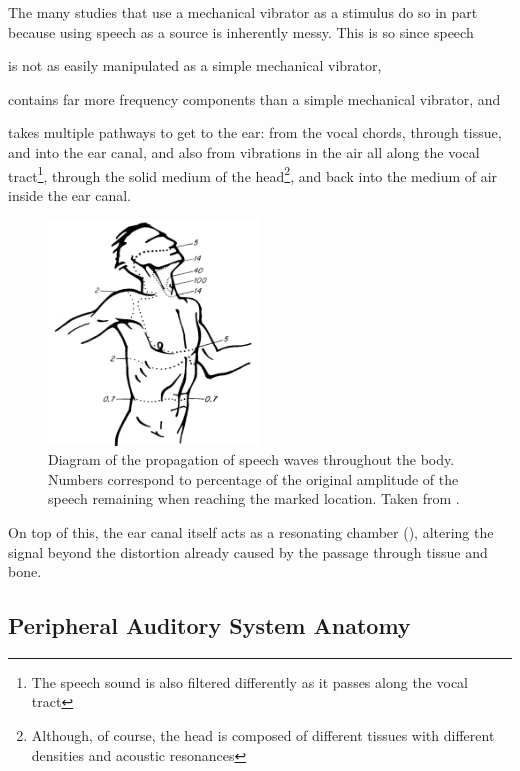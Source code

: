 \documentclass[dissertation,copyright]{uathesis}
\begin{document}
The many studies that use a mechanical vibrator as a stimulus do so in part because using speech as a source is inherently messy.  This is so since speech 
\begin{enumerate*}[label={\alph*)}]
  \item  is not as easily manipulated as a simple mechanical vibrator,
  \item  contains far more frequency components than a simple mechanical vibrator, and 
  \item  takes multiple pathways to get to the ear: from the vocal chords, through tissue, and into the ear canal, and also from vibrations in the air all along the vocal tract\footnote{The speech sound is also filtered differently as it passes along the vocal tract}, through the solid medium of the head\footnote{Although, of course, the head is composed of different tissues with different densities and acoustic resonances}, and back into the medium of air inside the ear canal.
\end{enumerate*}
% 
\begin{figure}
\centering
  \includegraphics[width=0.5\textwidth]{figure/bekesy60-3b.png}
  \caption{Diagram of the propagation of speech waves throughout the body. Numbers correspond to percentage of the original amplitude of the speech remaining when reaching the marked location. Taken from \cite{bekesy:60}.}
  \label{fig:bekesyBodyTransfer}
\end{figure}
%
On top of this, the ear canal itself acts as a resonating chamber (\cite{rosen:91}), altering the signal beyond the distortion already caused by the passage through tissue and bone.  


\subsection{Peripheral Auditory System Anatomy}
\end{document}
